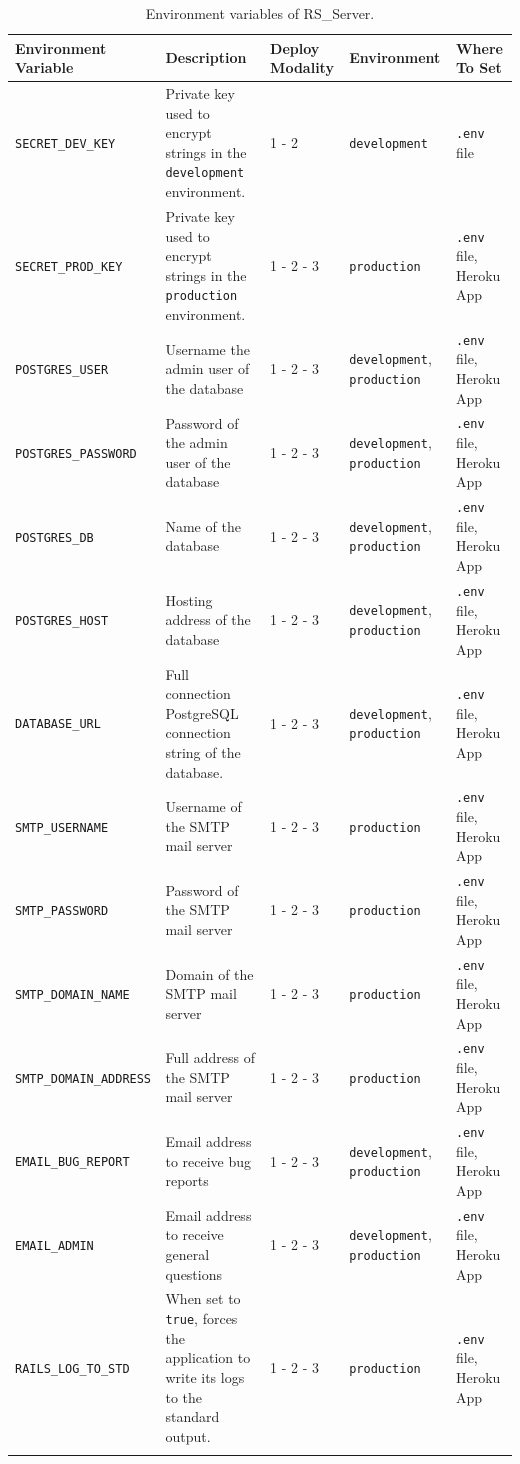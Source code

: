 \documentclass[a4paper, english]{article}
\newcommand{\rsserver}{RS\_Server\xspace}
\begin{document}
\begin{longtable}{p{3.5cm}p{3.2cm}p{2.5cm}p{2cm}p{2.7cm}}
\toprule
\textbf{Environment Variable}  &\textbf{Description} & \textbf{Deploy Modality} & \textbf{Environment} & \textbf{Where To Set} \\
\midrule
\endhead
\verb|SECRET_DEV_KEY| & Private key used to encrypt strings in the \verb|development| environment.  & 1 - 2 & \verb|development| & \verb|.env| file \\
\midrule
\verb|SECRET_PROD_KEY| & Private key used to encrypt strings in the \verb|production| environment. & 1 - 2 - 3 & \verb|production| & \verb|.env| file, Heroku App \\
\midrule
\verb|POSTGRES_USER| & Username the admin user of the database & 1 - 2 - 3 & \verb|development|, \verb|production| & \verb|.env| file, Heroku App \\
\midrule
\verb|POSTGRES_PASSWORD| & Password of the admin user of the database & 1 - 2 - 3 & \verb|development|, \verb|production| & \verb|.env| file, Heroku App \\
\midrule
\verb|POSTGRES_DB| & Name of the database & 1 - 2 - 3 & \verb|development|, \verb|production| & \verb|.env| file, Heroku App \\
\midrule
\verb|POSTGRES_HOST| & Hosting address of the database & 1 - 2 - 3 & \verb|development|, \verb|production| & \verb|.env| file, Heroku App \\
\midrule
\verb|DATABASE_URL| & Full connection PostgreSQL connection string of the database. & 1 - 2 - 3 & \verb|development|, \verb|production| & \verb|.env| file, Heroku App \\
\midrule
\verb|SMTP_USERNAME| & Username of the SMTP mail server & 1 - 2 - 3 & \verb|production| & \verb|.env| file, Heroku App \\
\midrule
\verb|SMTP_PASSWORD| & Password of the SMTP mail server & 1 - 2 - 3 & \verb|production| & \verb|.env| file, Heroku App \\
\midrule
\verb|SMTP_DOMAIN_NAME| & Domain of the SMTP mail server & 1 - 2 - 3 & \verb|production| & \verb|.env| file, Heroku App \\
\midrule
\verb|SMTP_DOMAIN_ADDRESS| & Full address of the SMTP mail server & 1 - 2 - 3 & \verb|production| & \verb|.env| file, Heroku App \\
\midrule
\verb|EMAIL_BUG_REPORT| & Email address to receive bug reports & 1 - 2 - 3 & \verb|development|, \verb|production| & \verb|.env| file, Heroku App \\
\midrule
\verb|EMAIL_ADMIN| & Email address to receive general questions & 1 - 2 - 3 & \verb|development|, \verb|production| & \verb|.env| file, Heroku App \\
\midrule
\verb|RAILS_LOG_TO_STD| & When set to \verb|true|, forces the application to write its logs to the standard output. & 1 - 2 - 3 & \verb|production| & \verb|.env| file, Heroku App \\
\bottomrule
\caption{Environment variables of \rsserver.}
\label{env}
\end{longtable}
\end{document}
